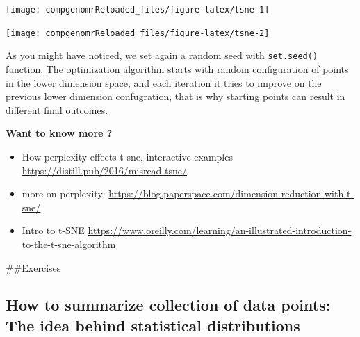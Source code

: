 \documentclass[12pt,]{krantz}
\newenvironment{Shaded}{\begin{snugshade}}{\end{snugshade}}
\newcommand{\CommentTok}[1]{\textcolor[rgb]{0.56,0.35,0.01}{\textit{#1}}}
\newcommand{\DataTypeTok}[1]{\textcolor[rgb]{0.13,0.29,0.53}{#1}}
\newcommand{\DecValTok}[1]{\textcolor[rgb]{0.00,0.00,0.81}{#1}}
\newcommand{\KeywordTok}[1]{\textcolor[rgb]{0.13,0.29,0.53}{\textbf{#1}}}
\newcommand{\NormalTok}[1]{#1}
\newcommand{\OperatorTok}[1]{\textcolor[rgb]{0.81,0.36,0.00}{\textbf{#1}}}
\newcommand{\OtherTok}[1]{\textcolor[rgb]{0.56,0.35,0.01}{#1}}
\newcommand{\StringTok}[1]{\textcolor[rgb]{0.31,0.60,0.02}{#1}}
\providecommand{\tightlist}{%
  \setlength{\itemsep}{0pt}\setlength{\parskip}{0pt}}
\theoremstyle{definition}
\theoremstyle{definition}
\theoremstyle{definition}
\theoremstyle{remark}
\let\BeginKnitrBlock\begin \let\EndKnitrBlock\end
\begin{document}
\begin{center}\texttt{[image: compgenomrReloaded\_files/figure-latex/tsne-1]} \end{center}

\begin{Shaded}
\end{Shaded}

\begin{center}\texttt{[image: compgenomrReloaded\_files/figure-latex/tsne-2]} \end{center}

As you might have noticed, we set again a random seed with
\texttt{set.seed()} function. The optimization algorithm starts with
random configuration of points in the lower dimension space, and each
iteration it tries to improve on the previous lower dimension
confugration, that is why starting points can result in different final
outcomes.

\BeginKnitrBlock{rmdtip}
\textbf{Want to know more ?}

\begin{itemize}
\tightlist
\item
  How perplexity effects t-sne, interactive examples
  \url{https://distill.pub/2016/misread-tsne/}
\item
  more on perplexity:
  \url{https://blog.paperspace.com/dimension-reduction-with-t-sne/}
\item
  Intro to t-SNE
  \url{https://www.oreilly.com/learning/an-illustrated-introduction-to-the-t-sne-algorithm}
\end{itemize}
\EndKnitrBlock{rmdtip}

\#\#Exercises

\hypertarget{how-to-summarize-collection-of-data-points-the-idea-behind-statistical-distributions-1}{%
\subsection{How to summarize collection of data points: The idea behind
statistical
distributions}\label{how-to-summarize-collection-of-data-points-the-idea-behind-statistical-distributions-1}}
\end{document}
